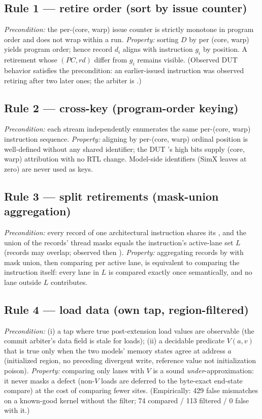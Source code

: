 \documentclass[review,12pt]{elsarticle}
\newcommand{\code}[1]{\texttt{\detokenize{#1}}}
\begin{document}
\subsection{Rule 1 — retire order (sort by issue counter)}
\emph{Precondition:} the per-(core, warp) issue counter is strictly
monotone in program order and does not wrap within a run.
\emph{Property:} sorting $D$ by \code{uuid} per (core, warp) yields
program order; hence record $d_i$ aligns with instruction $g_i$ by
position. A retirement whose $(PC, rd)$ differ from $g_i$ remains
visible. (Observed DUT behavior satisfies the precondition: an
earlier-issued instruction was observed retiring after two later
ones; the arbiter is \code{VX_commit.sv:56-71}.)

\subsection{Rule 2 — cross-key (program-order keying)}
\emph{Precondition:} each stream independently enumerates the same
per-(core, warp) instruction sequence. \emph{Property:} aligning by
per-(core, warp) ordinal position is well-defined without any shared
identifier; the DUT \code{uuid}'s high bits supply (core, warp)
attribution with no RTL change. Model-side identifiers (SimX leaves
\code{uuid} at zero) are never used as keys.

\subsection{Rule 3 — split retirements (mask-union aggregation)}
\emph{Precondition:} every record of one architectural instruction
shares its \code{uuid}, and the union of the records' thread masks
equals the instruction's active-lane set $L$ (records may overlap;
observed \code{0xd} then \code{0xe}). \emph{Property:} aggregating
records by \code{uuid} with mask union, then comparing per active
lane, is equivalent to comparing the instruction itself: every lane
in $L$ is compared exactly once semantically, and no lane outside
$L$ contributes.

\subsection{Rule 4 — load data (own tap, region-filtered)}
\emph{Precondition:} (i) a tap where true post-extension load values
are observable (the commit arbiter's data field is stale for loads);
(ii) a decidable predicate $V(a, v)$ that is true only when the two
models' memory states agree at address $a$ (initialized region, no
preceding divergent write, reference value not initialization
poison). \emph{Property:} comparing only lanes with $V$ is a sound
\emph{under}-approximation: it never masks a defect (non-$V$ loads
are deferred to the byte-exact end-state compare) at the cost of
comparing fewer sites. (Empirically: 429 false mismatches on a
known-good kernel without the filter; 74 compared / 113 filtered /
0 false with it.)
\end{document}
